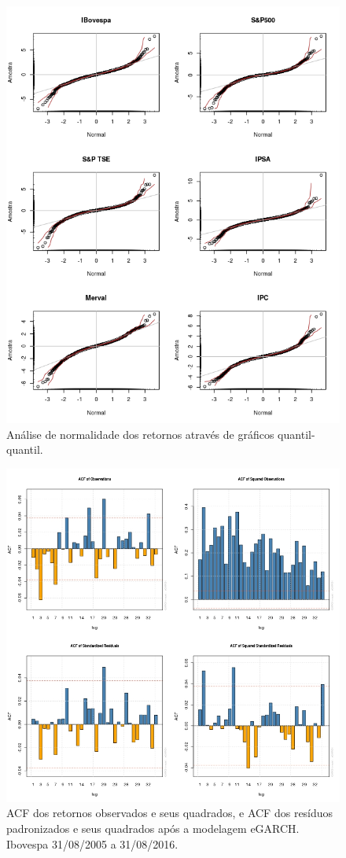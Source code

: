 \documentclass[review]{elsarticle}
\theoremstyle{definition}
\begin{document}
\begin{figure}[H]
	\centering
	\includegraphics[width=0.9\linewidth]{artigo-qqplots}
	\caption{Análise de normalidade dos retornos através de gráficos quantil-quantil.}
	\label{fig:artigo-qqplots}
\end{figure}

\begin{figure}[H]
	\centering
	\includegraphics[width=0.9\linewidth]{artigo-acf-IBovespa}
	\caption{ACF dos retornos observados e seus quadrados, e ACF dos resíduos padronizados e seus quadrados após a modelagem eGARCH. Ibovespa 31/08/2005 a 31/08/2016.}
	\label{fig:artigo-acf-ibovespa}
\end{figure}
\end{document}
